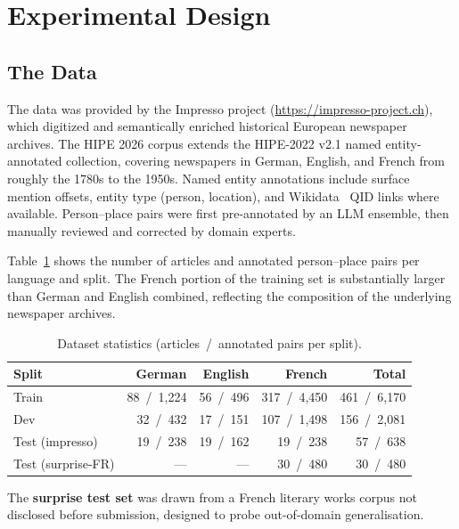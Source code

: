 \documentclass[
]{ceurart}
\theoremstyle{definition}
\begin{document}
\section{Experimental Design}\label{sec:method}

\subsection{The Data}

The data was provided by the Impresso project (\url{https://impresso-project.ch}), which digitized and semantically enriched historical European newspaper archives. The HIPE 2026 corpus extends the HIPE-2022 v2.1 named entity-annotated collection, covering newspapers in German, English, and French from roughly the 1780s to the 1950s. Named entity annotations include surface mention offsets, entity type (person, location), and Wikidata~\citep{vrandevcic2014wikidata} QID links where available. Person--place pairs were first pre-annotated by an LLM ensemble, then manually reviewed and corrected by domain experts.

Table~\ref{tab:data} shows the number of articles and annotated person--place pairs per language and split. The French portion of the training set is substantially larger than German and English combined, reflecting the composition of the underlying newspaper archives.

\begin{table}[t]
\centering
\caption{Dataset statistics (articles~/~annotated pairs per split).}
\label{tab:data}
\begin{tabular}{lrrrr}
\toprule
\textbf{Split} & \textbf{German} & \textbf{English} & \textbf{French} & \textbf{Total} \\
\midrule
Train              & 88~/~1{,}224   & 56~/~496         & 317~/~4{,}450   & 461~/~6{,}170  \\
Dev                & 32~/~432       & 17~/~151         & 107~/~1{,}498   & 156~/~2{,}081  \\
Test (impresso)    & 19~/~238       & 19~/~162         & 19~/~238        & 57~/~638       \\
Test (surprise-FR) & ---            & ---              & 30~/~480        & 30~/~480       \\
\bottomrule
\end{tabular}
\end{table}

The \textbf{surprise test set} was drawn from a French literary works corpus not disclosed before submission, designed to probe out-of-domain generalisation.
\end{document}
